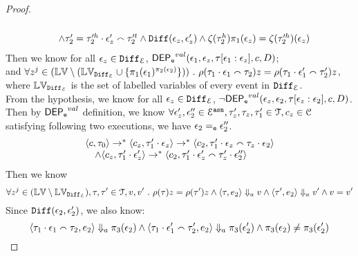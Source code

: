 \begin{proof}
\[\begin{array}{l}
	\\ \quad
	\land 
	\mathtt{\tau}_2' = \mathtt{\tau}'^h_2 \cdot \mathtt{\epsilon}_z' \smallfrown \mathtt{\tau}'^t_2
	\land 
	\mathtt{Diff}(\mathtt{\epsilon}_z, \mathtt{\epsilon}_z')
	\land 
	\mathtt{\zeta}(\mathtt{\tau}_2^h) \pi_1(\mathtt{\epsilon}_z) = \mathtt{\zeta}(\mathtt{\tau}'^h_2)(\mathtt{\epsilon}_z)
\end{array}		
\]
%
Then we know for all $\mathtt{\epsilon}_z \in  \mathtt{Diff}_{\mathcal{E}}$,
 $\mathsf{DEP_{\mathtt{e}}}^{val}(\mathtt{\epsilon}_1, \mathtt{\epsilon}_z, \mathtt{\tau}[\mathtt{\epsilon}_1:\mathtt{\epsilon}_z], c, D)$;
\\
and $\forall z^j \in (\mathbb{LV} \setminus (\mathbb{LV}_{\mathtt{Diff}_{\mathcal{E}}} \cup\{\pi_1(\mathtt{\epsilon}_1)^{\pi_2(\mathtt{\epsilon}_2)}\}) ) ~.~ 
\rho(\mathtt{\tau}_1 \cdot \mathtt{\epsilon}_1 \smallfrown \mathtt{\tau}_2) z = \rho(\mathtt{\tau}_1 \cdot \mathtt{\epsilon}_1' \smallfrown \mathtt{\tau}_2') z $,
\\
where $\mathbb{LV}_{\mathtt{Diff}_{\mathcal{E}}}$ is the set of labelled variables of every event in $\mathtt{Diff}_{\mathcal{E}}$.
\\
From the hypothesis, we know for all $\mathtt{\epsilon}_z \in  \mathtt{Diff}_{\mathcal{E}}$, $\neg \mathsf{DEP_{\mathtt{e}}}^{val}(\mathtt{\epsilon}_z, \mathtt{\epsilon}_2, \mathtt{\tau}[\mathtt{\epsilon}_z:\mathtt{\epsilon}_2], c, D) $.
\\
Then by $\mathsf{DEP_{\mathtt{e}}}^{val}$ definition, we know 
$\forall \mathtt{\epsilon}_z', \mathtt{\epsilon}_2'' \in \mathcal{E}^{\mathtt{{asn}}}, \mathtt{\tau}_z',\mathtt{\tau}_z,  \mathtt{\tau}_1' \in \mathcal{T}, c_z \in \mathcal{C}$ satisfying following two executions, we have $\mathtt{\epsilon}_2 =_{\mathtt{e}} \mathtt{\epsilon}_2''$.
\[
	\begin{array}{l}
		\langle c, \mathtt{\tau}_0 \rangle \rightarrow^{*}
		\langle c_z, \mathtt{\tau}_1' \cdot \mathtt{\epsilon}_z \rangle \rightarrow^{*} \langle c_2, \mathtt{\tau}_1' \cdot \mathtt{\epsilon}_z \smallfrown \mathtt{\tau}_z \cdot \mathtt{\epsilon}_2 \rangle 
		\\ \quad
		\land
		\langle c_z, \mathtt{\tau}_1' \cdot \mathtt{\epsilon}_z' \rangle \rightarrow^{*} \langle c_2, \mathtt{\tau}_1' \cdot \mathtt{\epsilon}_z' \smallfrown \mathtt{\tau}_z' \cdot \mathtt{\epsilon}_2'' \rangle 
		\end{array}		
\]
%
Then we know 
\[
	\forall z^j \in (\mathbb{LV} \setminus \mathbb{LV}_{\mathtt{Diff}_{\mathcal{E}}} ), \mathtt{\tau}, \mathtt{\tau}' \in \mathcal{T}, v, v' ~.~ 
	\rho(\mathtt{\tau}) z = \rho(\mathtt{\tau}') z 
	\land 
	\langle \mathtt{\tau}, e_2 \rangle \Downarrow_a v 
	\land 
	\langle \mathtt{\tau}', e_2 \rangle \Downarrow_a v'
	\land 
	v = v' 
\]
%
Since $\mathtt{Diff}(\mathtt{\epsilon}_2, \mathtt{\epsilon}_2')$, we also know:
%
\[	
\langle \mathtt{\tau}_1 \cdot \mathtt{\epsilon}_1 \smallfrown \mathtt{\tau}_2, e_2 \rangle \Downarrow_a \pi_3(\mathtt{\epsilon}_2)
\land 
\langle \mathtt{\tau}_1 \cdot \mathtt{\epsilon}_1' \smallfrown \mathtt{\tau}_2', e_2 \rangle \Downarrow_a \pi_3(\mathtt{\epsilon}_2') 
\land 
\pi_3(\mathtt{\epsilon}_2) \neq \pi_3(\mathtt{\epsilon}_2')
\]
%

\end{proof}
